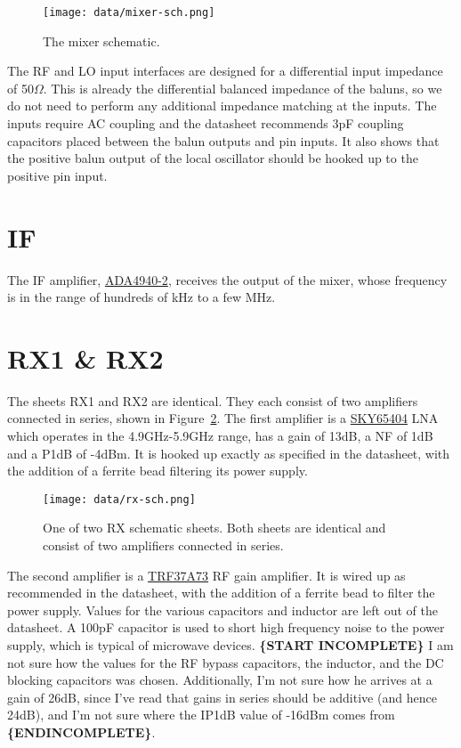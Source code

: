 \documentclass{default}
\begin{document}
\begin{figure}[ht]
  \centering
  \texttt{[image: data/mixer-sch.png]}
  \caption{The mixer schematic.}
  \label{fig:mixer-sch}
\end{figure}

The RF and LO input interfaces are designed for a differential input impedance of 50$\Omega$. This
is already the differential balanced impedance of the baluns, so we do not need to perform any
additional impedance matching at the inputs. The inputs require AC coupling and the datasheet
recommends 3pF coupling capacitors placed between the balun outputs and pin inputs. It also shows
that the positive balun output of the local oscillator should be hooked up to the positive pin
input.

\section{IF}

The IF amplifier,
\href{http://www.analog.com/media/en/technical-documentation/data-sheets/ADA4940-1_4940-2.pdf}{ADA4940-2},
receives the output of the mixer, whose frequency is in the range of hundreds of kHz to a few MHz.

\section{RX1 \& RX2}

The sheets RX1 and RX2 are identical. They each consist of two amplifiers connected in series, shown
in Figure~\ref{fig:rx-sch}. The first amplifier is a
\href{http://www.skyworksinc.com/uploads/documents/SKY65404_31_201512J.pdf}{SKY65404} LNA which
operates in the 4.9GHz-5.9GHz range, has a gain of 13dB, a NF of 1dB and a P1dB of -4dBm. It is
hooked up exactly as specified in the datasheet, with the addition of a ferrite bead filtering its
power supply.

\begin{figure}[h]
  \centering
  \texttt{[image: data/rx-sch.png]}
  \caption{One of two RX schematic sheets. Both sheets are identical and consist of two amplifiers
    connected in series.}
  \label{fig:rx-sch}
\end{figure}

The second amplifier is a \href{http://www.ti.com/lit/ds/symlink/trf37a73.pdf}{TRF37A73} RF gain
amplifier. It is wired up as recommended in the datasheet, with the addition of a ferrite bead to
filter the power supply. Values for the various capacitors and inductor are left out of the
datasheet. A 100pF capacitor is used to short high frequency noise to the power supply, which is
typical of microwave devices. \textbf{\{START INCOMPLETE\}} I am not sure how the values for the RF
bypass capacitors, the inductor, and the DC blocking capacitors was chosen. Additionally, I'm not
sure how he arrives at a gain of 26dB, since I've read that gains in series should be additive (and
hence 24dB), and I'm not sure where the IP1dB value of -16dBm comes from \textbf{\{ENDINCOMPLETE\}}.
\end{document}
